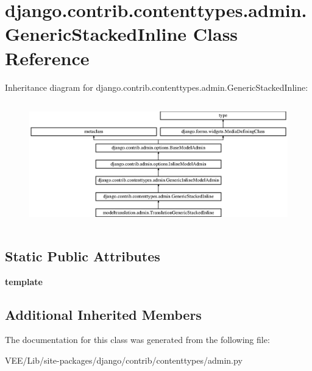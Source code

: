 \hypertarget{classdjango_1_1contrib_1_1contenttypes_1_1admin_1_1_generic_stacked_inline}{}\section{django.\+contrib.\+contenttypes.\+admin.\+Generic\+Stacked\+Inline Class Reference}
\label{classdjango_1_1contrib_1_1contenttypes_1_1admin_1_1_generic_stacked_inline}
Inheritance diagram for django.\+contrib.\+contenttypes.\+admin.\+Generic\+Stacked\+Inline\+:\begin{figure}[H]
\begin{center}
\leavevmode
\includegraphics[height=5.414365cm]{classdjango_1_1contrib_1_1contenttypes_1_1admin_1_1_generic_stacked_inline}
\end{center}
\end{figure}
\subsection*{Static Public Attributes}
\begin{DoxyCompactItemize}
\item 
\mbox{\label{classdjango_1_1contrib_1_1contenttypes_1_1admin_1_1_generic_stacked_inline_a3d6ef5f721613857e2771b343185e258}} 
{\bfseries template}
\end{DoxyCompactItemize}
\subsection*{Additional Inherited Members}


The documentation for this class was generated from the following file\+:\begin{DoxyCompactItemize}
\item 
V\+E\+E/\+Lib/site-\/packages/django/contrib/contenttypes/admin.\+py\end{DoxyCompactItemize}
